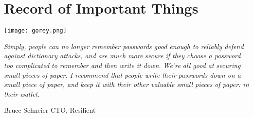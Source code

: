 \documentclass[12pt]{book}
\begin{document}



\newpage

\chapter*{Record of Important Things}

\begin{center}
	\texttt{[image: gorey.png]}
\end{center}

\begin{small}
\textit{Simply, people can no longer remember passwords good enough to reliably defend against dictionary attacks, and are much more secure if they choose a password too complicated to remember and then write it down. We're all good at securing small pieces of paper. I recommend that people write their passwords down on a small piece of paper, and keep it with their other valuable small pieces of paper: in their wallet.}
\begin{flushright}{Bruce Schneier CTO, Resilient}\end{flushright}
\end{small}



\cleardoublepage
{}
\pagestyle{headings}

























































\newpage
\pagestyle{empty}
\paragraph{}
\cleardoublepage



\newpage
\pagestyle{empty}
\paragraph{}
\cleardoublepage


\end{document}

